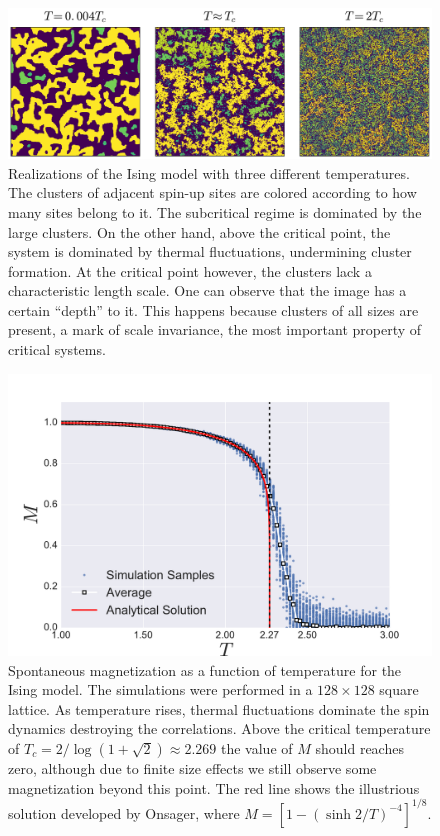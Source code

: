 \begin{figure}
\begin{center}
    \includegraphics[scale=0.4]{chapters/ch2-crit/figs/ising}
\end{center}
\caption{Realizations of the Ising model with three different
    temperatures. The clusters of adjacent spin-up sites are colored according
    to how many sites belong to it. The subcritical regime is dominated by the
    large clusters. On the other hand, above the critical point, the system is
    dominated by thermal fluctuations, undermining cluster formation. At the
    critical point however, the clusters lack a characteristic length scale.
    One can observe that the image has a certain ``depth'' to it. This happens
    because clusters of all sizes are present, a mark of scale invariance,
    the most important property of critical systems.}
\label{fig:ising}
\end{figure}

\begin{figure}
\begin{center}
    \includegraphics[scale=0.4]{chapters/ch2-crit/figs/ising_phase}
\end{center}
\caption{Spontaneous magnetization as a function of temperature for the Ising
    model. The simulations were performed in a $128\times128$ square lattice.
    As temperature rises, thermal fluctuations dominate the spin dynamics
    destroying the correlations. Above the critical temperature of
    $T_c=2/\log(1+\sqrt{2})\approx 2.269$ the value of $M$ should reaches zero,
    although due to finite size effects we still observe some magnetization
    beyond this point. The red line shows the illustrious solution
    developed by Onsager, where $M={[1-{(\sinh{2/T})}^{-4}]}^{1/8}$.}
\label{fig:ising_phase}
\end{figure}


